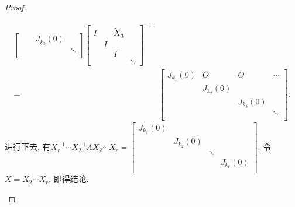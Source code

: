\documentclass{ctexart}
\def\zero{O}
\def\wtd{\widetilde}
\begin{document}
\begin{proof}
\begin{enumerate}
\begin{align*}
\begin{bmatrix}
            && J_{k_3}(0)\\
            &&&\ddots \\
                    \end{bmatrix}\begin{bmatrix}
                        I & &\wtd X_3 \\ & I \\ & &I\\&&&\ddots 
                    \end{bmatrix}^{-1}\\
                    =&\begin{bmatrix}
                    J_{k_1}(0) & \zero & \zero & \cdots \\
            &J_{k_2}(0) \\
            && J_{k_3}(0)\\
            &&&\ddots \\
        \end{bmatrix}
        .
                \end{align*}
				进行下去, 有$X_r^{-1}\dotsm X_2^{-1}AX_2\dotsm X_r=\begin{bmatrix}
		J_{k_1}(0) \\
		&J_{k_2}(0)  \\
		&& \ddots \\
		&&&J_{k_r}(0)\\
	\end{bmatrix}$. 令$X=X_2\dotsm X_r$, 即得结论. 
	\end{enumerate}
\end{proof}
\end{document}
